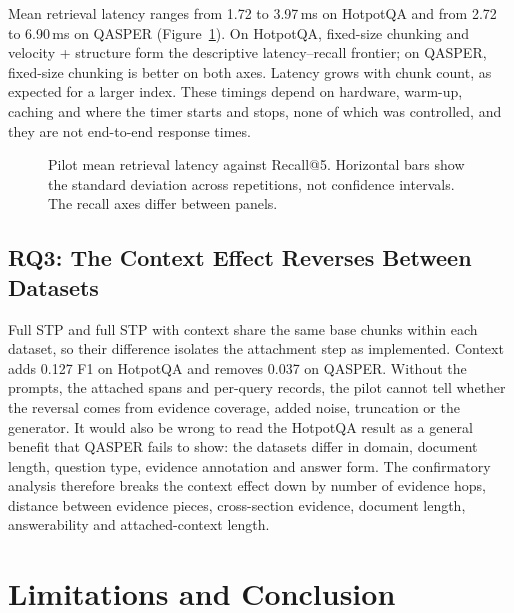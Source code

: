 \documentclass[10pt,a4paper]{article}
\begin{document}
Mean retrieval latency ranges from 1.72 to 3.97\,ms on HotpotQA and from 2.72 to 6.90\,ms on QASPER (Figure~\ref{fig:pareto}). On HotpotQA, fixed-size chunking and velocity + structure form the descriptive latency--recall frontier; on QASPER, fixed-size chunking is better on both axes. Latency grows with chunk count, as expected for a larger index. These timings depend on hardware, warm-up, caching and where the timer starts and stops, none of which was controlled, and they are not end-to-end response times.

\begin{figure}[!htbp]
\centering

\caption{Pilot mean retrieval latency against Recall@5. Horizontal bars show the standard deviation across repetitions, not confidence intervals. The recall axes differ between panels.}
\label{fig:pareto}
\end{figure}

\subsection{RQ3: The Context Effect Reverses Between Datasets}
Full STP and full STP with context share the same base chunks within each dataset, so their difference isolates the attachment step as implemented. Context adds 0.127 F1 on HotpotQA and removes 0.037 on QASPER. Without the prompts, the attached spans and per-query records, the pilot cannot tell whether the reversal comes from evidence coverage, added noise, truncation or the generator. It would also be wrong to read the HotpotQA result as a general benefit that QASPER fails to show: the datasets differ in domain, document length, question type, evidence annotation and answer form. The confirmatory analysis therefore breaks the context effect down by number of evidence hops, distance between evidence pieces, cross-section evidence, document length, answerability and attached-context length.

\section{Limitations and Conclusion}
\label{sec:limitations}
\end{document}
